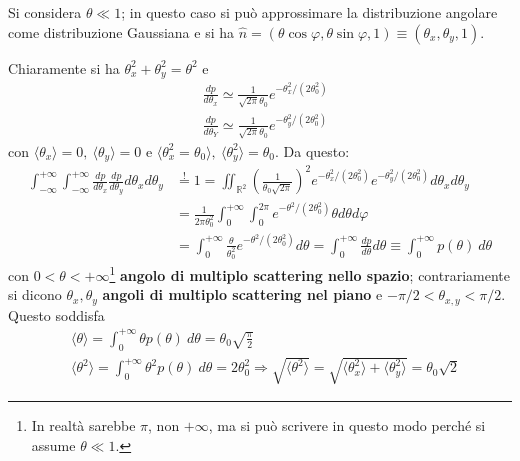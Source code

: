 \documentclass[10pt, a4paper]{scrartcl}
\numberwithin{equation}{subsection}
\theoremstyle{style1}
\begin{document}
Si considera $\theta  \ll 1$; in questo caso si pu\`o approssimare la distribuzione angolare come distribuzione Gaussiana e si ha $\hat{n} = (\theta  \cos \varphi , \theta  \sin \varphi  , 1)\equiv (\theta _x, \theta _y, 1)$.

Chiaramente si ha $\theta _x^2 + \theta _y^2 = \theta ^2$ e 
\[
\begin{split}
	& \frac{d p}{d \theta _x} \simeq \frac{1}{\sqrt{2 \pi }  \theta _0} e^{-\theta _x^2 / (2 \theta _0^2)} \\
	& \frac{d p}{d \theta _Y} \simeq \frac{1}{\sqrt{2 \pi }  \theta _0} e^{-\theta _y^2 / (2 \theta _0^2)} 
\end{split}
\] 
con $\langle \theta _x  \rangle=0, \ \langle \theta _y \rangle = 0$ e $\langle \theta _x^2 = \theta _0 \rangle, \ \langle \theta _y ^2  \rangle = \theta _0$. Da questo:
\begin{equation}
	\begin{split}
		\int_{-\infty} ^{+\infty} \int_{-\infty} ^{+\infty} \frac{d p}{d \theta _x}  \frac{d p}{d \theta _y} d\theta _x d\theta _y &\stackrel{!}{=} 1 = \iint_{\mathbb{R}^2} \left(\frac{1}{\theta _0 \sqrt{2\pi} } \right) ^2 e^{- \theta _x^2 / (2\theta _0^2)} e^{- \theta _y^2 / (2\theta _0^2)} d\theta _x d\theta _y  \\
																	   &= \frac{1}{2\pi \theta _0^2}\int_{0} ^{+\infty} \int_{0} ^{2 \pi} e^{- \theta^2 / (2\theta _0^2)} \theta  d\theta d\varphi  \\						&=  \int_{0} ^{+\infty}  \frac{\theta}{\theta _0^2} e^{- \theta ^2 / (2\theta _0^2)}  d\theta = \int_{0} ^{+\infty} \frac{d p}{d \theta } d\theta \equiv \int_{0} ^{+\infty} p(\theta ) \ d\theta 
	\end{split}
\end{equation}
con $0 < \theta < +\infty $\footnote{In realt\`a sarebbe $\pi$, non $+\infty$, ma si pu\`o scrivere in questo modo perch\'e si assume $\theta \ll 1$.} \textbf{angolo di multiplo scattering nello spazio}; contrariamente si dicono $\theta _x , \theta _y$ \textbf{angoli di multiplo scattering nel piano}  e $- \pi / 2 < \theta _{x,y} < \pi / 2$. Questo soddisfa
\begin{equation}
	\begin{split}
		&\langle \theta  \rangle = \int_{0} ^{+\infty} \theta  p(\theta ) \ d\theta = \theta _0 \sqrt{\frac{\pi}{2}} \\
		& \langle \theta ^2 \rangle = \int_{0} ^{+\infty} \theta ^2 p(\theta ) \ d\theta  =2 \theta _0^2\Rightarrow \sqrt{\langle \theta ^2 \rangle} = \sqrt{\langle \theta _x^2 \rangle + \langle \theta _y^2 \rangle} = \theta _0 \sqrt{2} 
	\end{split}
\end{equation}
\end{document}
